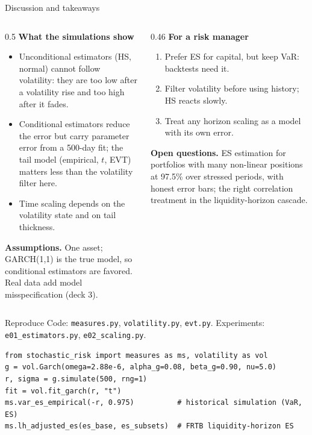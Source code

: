 \documentclass[aspectratio=169,10pt]{beamer}
\begin{document}
\begin{frame}{Discussion and takeaways}
  \small
  \begin{columns}[T]
    \begin{column}{0.5\textwidth}
      \textbf{What the simulations show}
      \begin{itemize}
        \item Unconditional estimators (HS, normal) cannot follow volatility: they are too low after a volatility rise and too high after it fades.
        \item Conditional estimators reduce the error but carry parameter error from a 500-day fit; the tail model (empirical, $t$, EVT) matters less than the volatility filter here.
        \item Time scaling depends on the volatility state and on tail thickness.
      \end{itemize}
      \textbf{Assumptions.} One asset; GARCH(1,1) is the true model, so conditional estimators are favored. Real data add model misspecification (deck 3).
    \end{column}
    \begin{column}{0.46\textwidth}
      \textbf{For a risk manager}
      \begin{enumerate}
        \item Prefer ES for capital, but keep VaR: backtests need it.
        \item Filter volatility before using history; HS reacts slowly.
        \item Treat any horizon scaling as a model with its own error.
      \end{enumerate}
      \textbf{Open questions.} ES estimation for portfolios with many non-linear positions at 97.5\% over stressed periods, with honest error bars; the right correlation treatment in the liquidity-horizon cascade.
    \end{column}
  \end{columns}
\end{frame}

\begin{frame}[fragile]{Reproduce}
  \small
  Code: \texttt{measures.py}, \texttt{volatility.py}, \texttt{evt.py}. Experiments: \texttt{e01\_estimators.py}, \texttt{e02\_scaling.py}.
\begin{verbatim}
from stochastic_risk import measures as ms, volatility as vol
g = vol.Garch(omega=2.88e-6, alpha_g=0.08, beta_g=0.90, nu=5.0)
r, sigma = g.simulate(500, rng=1)
fit = vol.fit_garch(r, "t")
ms.var_es_empirical(-r, 0.975)          # historical simulation (VaR, ES)
ms.lh_adjusted_es(es_base, es_subsets)  # FRTB liquidity-horizon ES
\end{verbatim}
\end{frame}

\deckreferences
\end{document}
